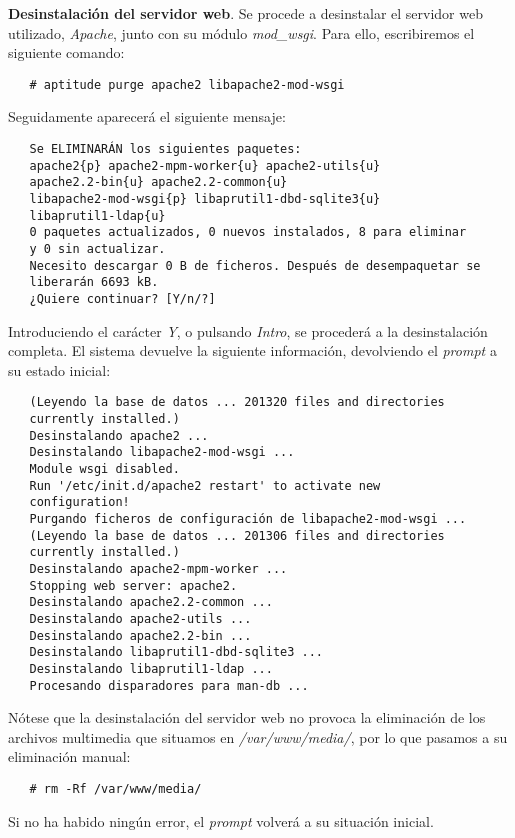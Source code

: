 \item \textbf{Desinstalación del servidor web}.
   Se procede a desinstalar el servidor web utilizado, \textit{Apache}, junto
   con su módulo \textit{mod\_wsgi}. Para ello, escribiremos el siguiente
   comando:

   \begin{verbatim}
   # aptitude purge apache2 libapache2-mod-wsgi
   \end{verbatim}

   Seguidamente aparecerá el siguiente mensaje:

   \begin{verbatim}
   Se ELIMINARÁN los siguientes paquetes:
   apache2{p} apache2-mpm-worker{u} apache2-utils{u}
   apache2.2-bin{u} apache2.2-common{u}
   libapache2-mod-wsgi{p} libaprutil1-dbd-sqlite3{u}
   libaprutil1-ldap{u}
   0 paquetes actualizados, 0 nuevos instalados, 8 para eliminar
   y 0 sin actualizar.
   Necesito descargar 0 B de ficheros. Después de desempaquetar se
   liberarán 6693 kB.
   ¿Quiere continuar? [Y/n/?]
   \end{verbatim}

   Introduciendo el carácter \textit{Y}, o pulsando \textit{Intro}, se procederá
   a la desinstalación completa. El sistema devuelve la siguiente información,
   devolviendo el \textit{prompt} a su estado inicial:

   \begin{verbatim}
   (Leyendo la base de datos ... 201320 files and directories
   currently installed.)
   Desinstalando apache2 ...
   Desinstalando libapache2-mod-wsgi ...
   Module wsgi disabled.
   Run '/etc/init.d/apache2 restart' to activate new
   configuration!
   Purgando ficheros de configuración de libapache2-mod-wsgi ...
   (Leyendo la base de datos ... 201306 files and directories
   currently installed.)
   Desinstalando apache2-mpm-worker ...
   Stopping web server: apache2.
   Desinstalando apache2.2-common ...
   Desinstalando apache2-utils ...
   Desinstalando apache2.2-bin ...
   Desinstalando libaprutil1-dbd-sqlite3 ...
   Desinstalando libaprutil1-ldap ...
   Procesando disparadores para man-db ...
   \end{verbatim}

   Nótese que la desinstalación del servidor web no provoca la eliminación de
   los archivos multimedia que situamos en \textit{/var/www/media/}, por lo que
   pasamos a su eliminación manual:

   \begin{verbatim}
   # rm -Rf /var/www/media/
   \end{verbatim}

   Si no ha habido ningún error, el \textit{prompt} volverá a su situación
   inicial.